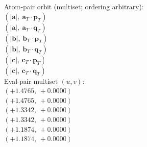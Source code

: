 \documentclass[a4paper,11pt]{article}
\newcommand{\vc}[1]{\ensuremath{\mathbf{#1}}}
\newcommand{\dnfagmiihhiejm}[1]{|\vc{#1}|}
\newcommand{\fpbeomcfokjooi}[2]{\mathbf{#1}_T \cdot \mathbf{#2}_T}
\begin{document}
\quad Atom-pair orbit (multiset; ordering arbitrary):\\
$(\dnfagmiihhiejm{a},\ \fpbeomcfokjooi{a}{p})$\\
$(\dnfagmiihhiejm{a},\ \fpbeomcfokjooi{a}{q})$\\
$(\dnfagmiihhiejm{b},\ \fpbeomcfokjooi{b}{p})$\\
$(\dnfagmiihhiejm{b},\ \fpbeomcfokjooi{b}{q})$\\
$(\dnfagmiihhiejm{c},\ \fpbeomcfokjooi{c}{p})$\\
$(\dnfagmiihhiejm{c},\ \fpbeomcfokjooi{c}{q})$\\
\quad Eval-pair multiset $(u, v)$:\\
$(+1.4765,\ +0.0000)$\\
$(+1.4765,\ +0.0000)$\\
$(+1.3342,\ +0.0000)$\\
$(+1.3342,\ +0.0000)$\\
$(+1.1874,\ +0.0000)$\\
$(+1.1874,\ +0.0000)$\\
\end{document}
